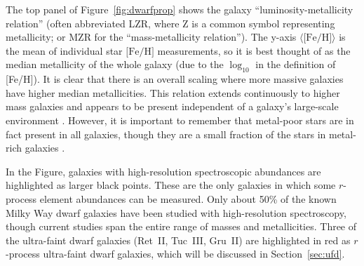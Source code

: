 \documentclass[letterpaper]{article}
\begin{document}
The top panel of Figure~\ref{fig:dwarfprop} shows the galaxy ``luminosity-metallicity relation'' (often abbreviated LZR, where Z is a common symbol representing metallicity; or MZR for the ``mass-metallicity relation''). The y-axis $\langle\mbox{[Fe/H]}\rangle$ is the mean of individual star $\mbox{[Fe/H]}$ measurements, so it is best thought of as the median metallicity of the whole galaxy (due to the $\log_{10}$ in the definition of [Fe/H]).
It is clear that there is an overall scaling where more massive galaxies have higher median metallicities.
This relation extends continuously to higher mass galaxies and appears to be present independent of a galaxy's large-scale environment \citep{Kirby2013}.
However, it is important to remember that metal-poor stars are in fact present in all galaxies, though they are a small fraction of the stars in metal-rich galaxies \citep[e.g.,][]{Frebel2010a,Chiti2018,Reggiani2021}.

In the Figure,  galaxies with high-resolution spectroscopic abundances are highlighted as larger black points. These are the only galaxies in which some $r$-process element abundances can be measured. Only about 50\% of the known Milky Way dwarf galaxies have been studied with high-resolution spectroscopy, though current studies span the entire range of masses and metallicities.
Three of the ultra-faint dwarf galaxies (Ret~II, Tuc~III, Gru~II) are highlighted in red as $r$-process ultra-faint dwarf galaxies, which will be discussed in Section~\ref{sec:ufd}.
\end{document}
